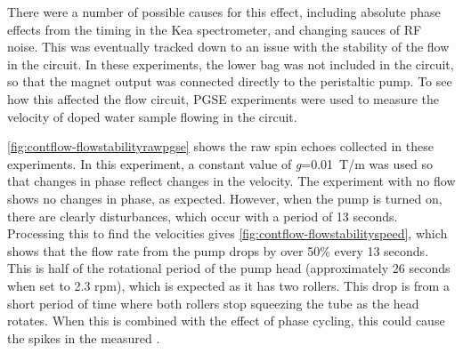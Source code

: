 There were a number of possible causes for this effect, including absolute phase effects from the timing in the Kea spectrometer, and changing sauces of RF  noise.
This was eventually tracked down to an issue with the stability of the flow in the circuit.
In these experiments, the lower bag was not included in the circuit, so that the magnet output was connected directly to the peristaltic pump.
To see how this affected the flow circuit, PGSE experiments were used to measure the velocity of doped water sample flowing in the circuit.

\autoref{fig:contflow-flowstabilityrawpgse} shows the raw spin echoes collected in these experiments.
In this experiment, a constant value of \textit{g}=\SI{0.01}{T/m} was used so that changes in phase reflect changes in the velocity.
The experiment with no flow shows no changes in phase, as expected.
However, when the pump is turned on, there are clearly disturbances, which occur with a period of 13 seconds.
Processing this to find the velocities gives \autoref{fig:contflow-flowstabilityspeed}, which shows that the flow rate from the pump drops by over 50\% every 13 seconds.
This is half of the rotational period of the pump head (approximately 26 seconds when set to 2.3 rpm), which is expected as it has two rollers.
This drop is from a short period of time where both rollers stop squeezing the tube as the head rotates.
When this is combined with the effect of phase cycling, this could cause the spikes in the measured \Ttwo.

